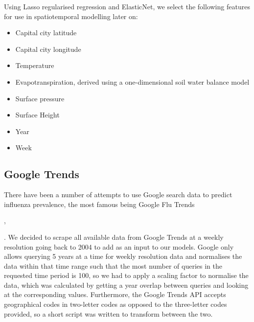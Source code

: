 \documentclass[letterpaper,10pt,english]{sphinxmanual}
\begin{document}
Using Lasso regularised regression and ElasticNet, we select the following features for use in spatiotemporal modelling later on:
\begin{itemize}
\item {} 
Capital city latitude

\item {} 
Capital city longitude

\item {} 
Temperature

\item {} 
Evapotranspiration, derived using a one-dimensional soil water balance model

\item {} 
Surface pressure

\item {} 
Surface Height

\item {} 
Year

\item {} 
Week

\end{itemize}


\subsection{Google Trends}
\label{\detokenize{datasets:google-trends}}
There have been a number of attempts to use Google search data to predict influenza prevalence, the most famous being Google Flu Trends %
\begin{footnote}[8]\sphinxAtStartFootnote
{} , 
%
\end{footnote}. We decided to scrape all available data from Google Trends at a weekly resolution going back to 2004 to add as an input to our models. Google only allows querying 5 years at a time for weekly resolution data and normalises the data within that time range such that the most number of queries in the requested time period is 100, so we had to apply a scaling factor to normalise the data, which was calculated by getting a year overlap between queries and looking at the corresponding values. Furthermore, the Google Trends API accepts geographical codes in two-letter codes as opposed to the three-letter codes provided, so a short script was written to transform between the two.
\end{document}
